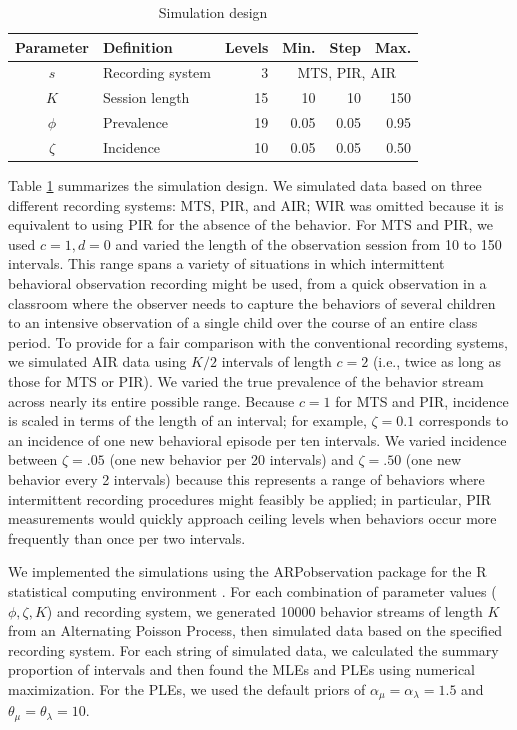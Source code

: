 \documentclass[man, noextraspace, floatsintext]{apa6}\usepackage[]{graphicx}\usepackage[]{color}
\begin{document}
\begin{table}[tb]
\centering
\caption{Simulation design}
\label{tb:simulation_design}
\begin{tabular}{clrrrr} \toprule
Parameter & Definition & Levels & Min. & Step & Max. \\ \midrule
$s$ & Recording system & 3 & \multicolumn{3}{c}{MTS, PIR, AIR} \\
$K$ & Session length & 15 & 10 & 10 & 150 \\
$\phi$ & Prevalence & 19 & 0.05 & 0.05 & 0.95 \\
$\zeta$ & Incidence & 10 & 0.05 & 0.05 & 0.50 \\
\bottomrule
\end{tabular}
\end{table}

Table \ref{tb:simulation_design} summarizes the simulation design.
We simulated data based on three different recording systems: MTS, PIR, and AIR; WIR was omitted because it is equivalent to using PIR for the absence of the behavior.
For MTS and PIR, we used $c = 1, d = 0$ and varied the length of the observation session from 10 to 150 intervals. 
This range spans a variety of situations in which intermittent behavioral observation recording might be used, from a quick observation in a classroom where the observer needs to capture the behaviors of several children to an intensive observation of a single child over the course of an entire class period. 
To provide for a fair comparison with the conventional recording systems, we simulated AIR data using $K / 2$ intervals of length $c = 2$ (i.e., twice as long as those for MTS or PIR). 
We varied the true prevalence of the behavior stream across nearly its entire possible range. 
Because $c = 1$ for MTS and PIR, incidence is scaled in terms of the length of an interval; for example, $\zeta = 0.1$ corresponds to an incidence of one new behavioral episode per ten intervals.
We varied incidence  between $\zeta = .05$ (one new behavior per 20 intervals) and $\zeta = .50$ (one new behavior every 2 intervals) because this represents a range of behaviors where intermittent recording procedures might feasibly be applied; in particular, PIR measurements would quickly approach ceiling levels when behaviors occur more frequently than once per two intervals. 

We implemented the simulations using the ARPobservation package \citep{Pustejovsky2014ARPobservation} for the R statistical computing environment \citep{RCoreTeam2014}. 
For each combination of parameter values ($\phi,\zeta,K$) and recording system, we generated 10000 behavior streams of length $K$ from an Alternating Poisson Process, then simulated data based on the specified recording system. 
For each string of simulated data, we calculated the summary proportion of intervals and then found the MLEs and PLEs using numerical maximization. 
For the PLEs, we used the default priors of $\alpha_\mu = \alpha_\lambda = 1.5$ and $\theta_\mu = \theta_\lambda = 10$.  
\end{document}
